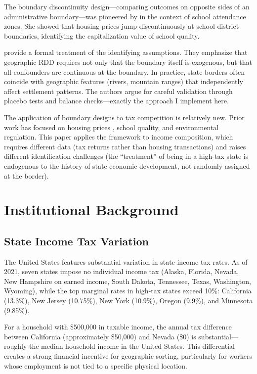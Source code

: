 \documentclass[12pt]{article}
\begin{document}
The boundary discontinuity design---comparing outcomes on opposite sides of an administrative boundary---was pioneered by \citet{black1999better} in the context of school attendance zones. She showed that housing prices jump discontinuously at school district boundaries, identifying the capitalization value of school quality.

\citet{keele2015geographic} provide a formal treatment of the identifying assumptions. They emphasize that geographic RDD requires not only that the boundary itself is exogenous, but that all confounders are continuous at the boundary. In practice, state borders often coincide with geographic features (rivers, mountain ranges) that independently affect settlement patterns. The authors argue for careful validation through placebo tests and balance checks---exactly the approach I implement here.

The application of boundary designs to tax competition is relatively new. Prior work has focused on housing prices \citep{bayer2007general}, school quality, and environmental regulation. This paper applies the framework to income composition, which requires different data (tax returns rather than housing transactions) and raises different identification challenges (the ``treatment'' of being in a high-tax state is endogenous to the history of state economic development, not randomly assigned at the border).


\section{Institutional Background}
\label{sec:background}

\subsection{State Income Tax Variation}

The United States features substantial variation in state income tax rates. As of 2021, seven states impose no individual income tax (Alaska, Florida, Nevada, New Hampshire on earned income, South Dakota, Tennessee, Texas, Washington, Wyoming), while the top marginal rates in high-tax states exceed 10\%: California (13.3\%), New Jersey (10.75\%), New York (10.9\%), Oregon (9.9\%), and Minnesota (9.85\%).

For a household with \$500,000 in taxable income, the annual tax difference between California (approximately \$50,000) and Nevada (\$0) is substantial---roughly the median household income in the United States. This differential creates a strong financial incentive for geographic sorting, particularly for workers whose employment is not tied to a specific physical location.
\end{document}
